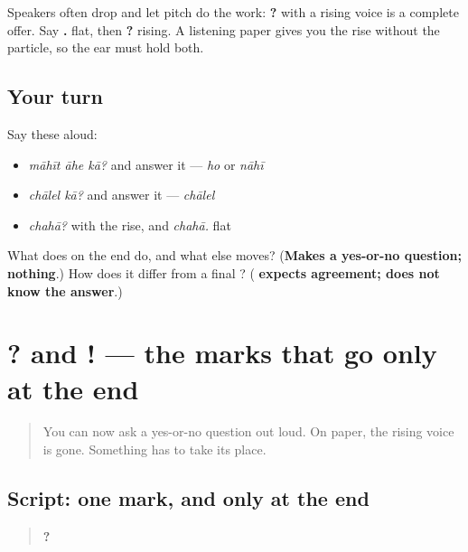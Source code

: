 \begin{sounds}
Speakers often drop \textbf{} and let pitch do the work: \textbf{?} with a rising voice is a complete offer. Say \textbf{.} flat, then \textbf{?} rising. A listening paper gives you the rise without the particle, so the ear must hold both.
\end{sounds}

\subsection*{Your turn}
Say these aloud:

\begin{itemize}
\raggedright
  \item \emph{māhīt āhe kā?} and answer it — \emph{ho} or \emph{nāhī}
  \item \emph{chālel kā?} and answer it — \emph{chālel}
  \item \emph{chahā?} with the rise, and \emph{chahā.} flat
\end{itemize}

\begin{tcolorbox}[breakable,colback=teal!4,colframe=teal!35!black,title={Before you move on}]
What does \textbf{} on the end do, and what else moves? (\textbf{Makes a yes-or-no question; nothing}.) How does it differ from a final \textbf{}? (\textbf{ expects agreement;  does not know the answer}.)
\end{tcolorbox}
\section[? ! (praśnacihna · udgārcihna)]{? and ! — the marks that go only at the end}

\label{lesson:MR-W33-question-mark}



\begin{quote}
You can now ask a yes-or-no question out loud. On paper, the rising voice is gone. Something has to take its place.
\end{quote}

\subsection*{Script: one mark, and only at the end}
\begin{quote}
\textbf{  ?}
\end{quote}

